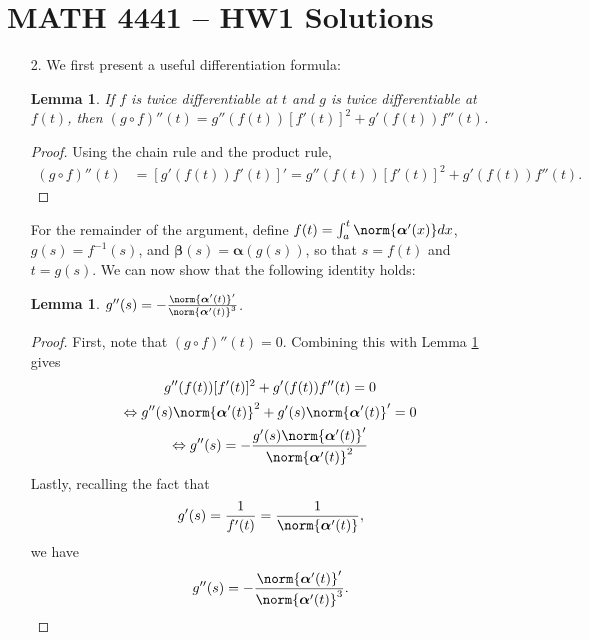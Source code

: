 \documentclass[a4paper,12pt]{article}
\newcommand{\bs}{\boldsymbol}
\newtheorem{lemma}[theorem]{Lemma}
\theoremstyle{remark}
\begin{document}
\section*{MATH 4441 -- HW1 Solutions}
\begin{enumerate}
    \item[2.]
        We first present a useful differentiation formula:
        \begin{lemma} \label{lem:2nd-deriv-comp}
            If $f$ is twice differentiable at $t$ and $g$ is twice differentiable at $f(t)$, then $(g \circ f)''(t) = g''(f(t))[f'(t)]^2 + g'(f(t)) f''(t)$.
        \end{lemma}
        \begin{proof}
            Using the chain rule and the product rule,
            \begin{align*}
                (g \circ f)''(t) &= [g'(f(t))f'(t)]' = g''(f(t))[f'(t)]^2 + g'(f(t)) f''(t).
            \end{align*}
        \end{proof}
        For the remainder of the argument, define $f(t) = \int_a^t \norm{\bs{\alpha}'(x)} dx$, $g(s) = f^{-1}(s)$, and $\bs{\beta}(s) = \bs{\alpha}(g(s))$, so that $s = f(t)$ and $t = g(s)$. We can now show that the following identity holds:
        \begin{lemma} \label{lem:g''}
            $g''(s) = -\frac{\norm{\bs{\alpha}'(t)}'}{\norm{\bs{\alpha}'(t)}^3}$.
        \end{lemma}
        \begin{proof}
            First, note that $(g \circ f)''(t) = 0$. Combining this with Lemma \ref{lem:2nd-deriv-comp} gives
            \begin{gather*}
                g''(f(t))[f'(t)]^2 + g'(f(t)) f''(t) = 0 \\
                \Leftrightarrow g''(s) \norm{\bs{\alpha}'(t)}^2 + g'(s) \norm{\bs{\alpha}'(t)}' = 0 \\
                \Leftrightarrow g''(s) = -\frac{g'(s) \norm{\bs{\alpha}'(t)}'}{\norm{\bs{\alpha}'(t)}^2}
            \end{gather*}
            Lastly, recalling the fact that
            \begin{align} \label{eq:g'}
                g'(s) = \frac{1}{f'(t)} = \frac{1}{\norm{\bs{\alpha}'(t)}},
            \end{align}
            we have
            \begin{align*}
                g''(s) = -\frac{\norm{\bs{\alpha}'(t)}'}{\norm{\bs{\alpha}'(t)}^3}.

\end{align*}
\end{proof}
\end{enumerate}
\end{document}

